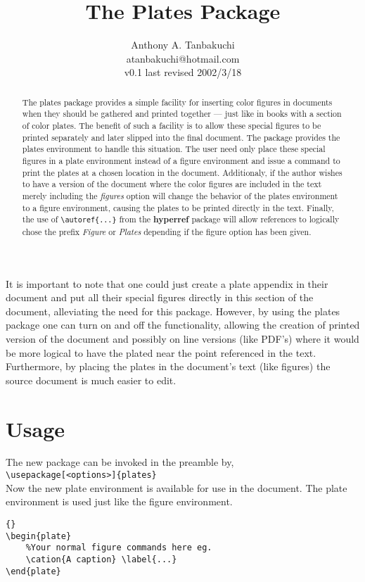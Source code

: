 \documentclass{article}
\title{The Plates Package}
\author{Anthony A. Tanbakuchi \\ \small{atanbakuchi@hotmail.com} \\ v0.1 last revised 2002/3/18}
\date{}
\begin{document}
\maketitle
\begin{abstract}
The plates package provides a simple facility for inserting color
figures in documents when they should be gathered and printed
together
--- just like in books with a section of color plates. The benefit of
such a facility is to allow these special figures to be printed
separately  and later slipped into the final document. The package
provides the plates environment to handle this situation. The user
need only place these special figures in a plate environment
instead of a figure environment and issue a command to print the
plates at a chosen location in the document. Additionaly, if the
author wishes to have a version of the document where the color
figures are included in the text merely including the
\emph{figures} option will change the behavior of the plates
environment to a figure environment, causing the plates to be
printed directly in the text. Finally, the use of
\lstinline!\autoref{...}! from the \textbf{hyperref} package will
allow references to logically chose the prefix \emph{Figure} or
\emph{Plates} depending if the figure option has been given.
\end{abstract}

It is important to note that one could just create a plate
appendix in their document and put all their special figures
directly in this section of the document, alleviating the need for
this package.  However, by using the plates package one can turn
on and off the functionality, allowing the creation of printed
version of the document and possibly on line versions (like PDF's)
where it would be more logical to have the plated near the point
referenced in the text.  Furthermore, by placing the plates in the
document's text (like figures) the source document is much easier
to edit.

\section{Usage}
The new package can be invoked in the preamble by,\\
\lstinline!\usepackage[<options>]{plates}!\\
Now the new plate environment is available for use in the
document.  The plate environment is used just like the figure
environment.

\begin{lstlisting}{}
\begin{plate}
    %Your normal figure commands here eg.
    \cation{A caption} \label{...}
\end{plate}
\end{lstlisting}
\end{document}
